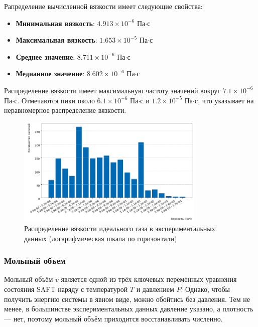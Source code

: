 \documentclass[a4paper,12pt]{article}
\begin{document}
      Рапределение вычисленной вязкости имеет следующие свойства:

      \begin{itemize}
          \item \textbf{Минимальная вязкость}: \(4.913 \times 10^{-6}\) Па\(\cdot\)с
          \item \textbf{Максимальная вязкость}: \(1.653 \times 10^{-5}\) Па\(\cdot\)с
          \item \textbf{Среднее значение}: \(8.711 \times 10^{-6}\) Па\(\cdot\)с
          \item \textbf{Медианное значение}: \(8.602 \times 10^{-6}\) Па\(\cdot\)с
      \end{itemize}
      
      Распределение вязкости имеет максимальную частоту значений вокруг \(7.1 \times 10^{-6}\) Па\(\cdot\)с.
      Отмечаются пики около \(6.1 \times 10^{-6}\) Па\(\cdot\)с и \(1.2 \times 10^{-5}\) Па\(\cdot\)с, что указывает на неравномерное распределение вязкости.
      
      \begin{figure}[ht!]
          \centering
          \includegraphics[width=0.8\textwidth]{data_distribution_viscosity_ideal_gas.png}
          \caption{Распределение вязкости идеального газа в экспериментальных данных (логарифмическая шкала по горизонтали)}
          \label{fig:data_distribution_viscosity_ideal_gas}
      \end{figure}

    \subsubsection{Мольный объем}
     
      Мольный объём \( v \) является одной из трёх ключевых переменных уравнения состояния SAFT наряду с температурой \( T \) и давлением \( P \). Однако, чтобы получить энергию системы в явном виде, можно обойтись без давления. Тем не менее, в большинстве экспериментальных данных давление указано, а плотность — нет, поэтому мольный объём приходится восстанавливать численно.
      
\end{document}
